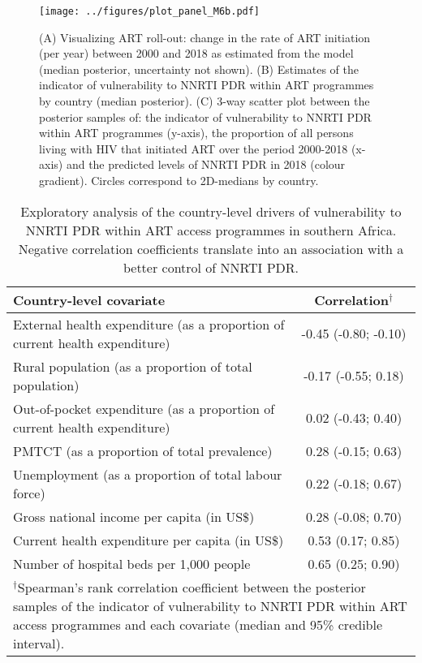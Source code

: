 \documentclass{article}
\begin{document}
\begin{figure}[t]
	\centering
	\texttt{[image: ../figures/plot\_panel\_M6b.pdf]}
	\caption{(A) Visualizing ART roll-out: change in the rate of ART initiation (per year) between 2000 and 2018 as estimated from the model (median posterior, uncertainty not shown). (B) Estimates of the indicator of vulnerability to NNRTI PDR within ART programmes by country (median posterior). (C) 3-way scatter plot between the posterior samples of: the indicator of vulnerability to NNRTI PDR within ART programmes (y-axis), the proportion of all persons living with HIV that initiated ART over the period 2000-2018 (x-axis) and the predicted levels of NNRTI PDR in 2018 (colour gradient). Circles correspond to 2D-medians by country.}
	\label{fig:misc}
\end{figure}



\begin{table}[ht]
	\centering
	\caption{Exploratory analysis of the country-level drivers of vulnerability to NNRTI PDR within ART access programmes in southern Africa. Negative correlation coefficients translate into an association with a better control of NNRTI PDR.}
	\label{tab:explo}
	\begin{tabular}{lc}
		\hline
		Country-level covariate & Correlation$^{\dagger}$\\ 
		\hline
		External health expenditure (as a proportion of current health expenditure) & -0.45 (-0.80; -0.10) \\ 
		Rural population (as a proportion of total population) & -0.17 (-0.55; 0.18) \\ 
		Out-of-pocket expenditure (as a proportion of current health expenditure) & 0.02 (-0.43; 0.40) \\ 
		PMTCT (as a proportion of total prevalence) & 0.28 (-0.15; 0.63) \\ 
		Unemployment (as a proportion of total labour force) & 0.22 (-0.18; 0.67) \\ 
		Gross national income per capita (in US\$) & 0.28 (-0.08; 0.70) \\ 
		Current health expenditure per capita (in US\$) & 0.53 (0.17; 0.85) \\ 
		Number of hospital beds per 1,000 people &  0.65 (0.25; 0.90) \\ 
		\hline
		\multicolumn{2}{p{13cm}}{\footnotesize{$^{\dagger}$Spearman's rank correlation coefficient between the posterior samples of the indicator of vulnerability to NNRTI PDR within ART access programmes and each covariate (median and 95\% credible interval).}}
	\end{tabular}
\end{table}
\end{document}
